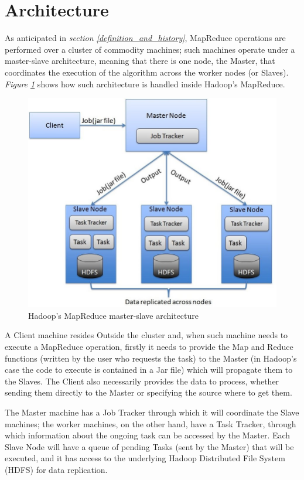 \section*{Architecture}\label{map_reduce_architecture}
As anticipated in \textit{section \ref{definition_and_history}}, MapReduce operations are performed over a cluster of commodity machines; such machines operate under a master-slave architecture, meaning that there is one node, the Master, that coordinates the execution of the algorithm across the worker nodes (or Slaves). \textit{Figure \ref{fig:hadoop_master_slave_architecture}} shows how such architecture is handled inside Hadoop's MapReduce.

\begin{figure}[H]
    \centering
    \includegraphics[scale=0.45]{document/appendix/appendix_1/images/hadoop_master_slave_architecture.png}
    \caption{Hadoop's MapReduce master-slave architecture\cite{hadoop_map_reduce}}
    \label{fig:hadoop_master_slave_architecture}
\end{figure}

A Client machine resides Outside the cluster and, when such machine needs to execute a MapReduce operation, firstly it needs to provide the Map and Reduce functions (written by the user who requests the task) to the Master (in Hadoop's case the code to execute is contained in a Jar file) which will propagate them to the Slaves. The Client also necessarily provides the data to process, whether sending them directly to the Master or specifying the source where to get them.

The Master machine has a Job Tracker through which it will coordinate the Slave machines; the worker machines, on the other hand, have a Task Tracker, through which information about the ongoing task can be accessed by the Master. Each Slave Node will have a queue of pending Tasks (sent by the Master) that will be executed, and it has access to the underlying Hadoop Distributed File System (HDFS) for data replication.